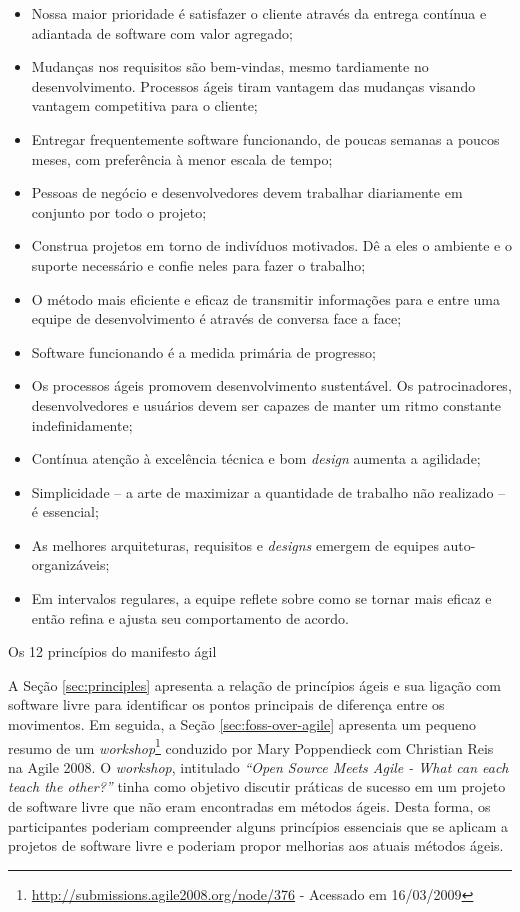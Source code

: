 \begin{caixa}[htb]
\begin{minipage}{\linewidth}
    \begin{itemize}
    \item Nossa maior prioridade é satisfazer o cliente através da
      entrega contínua e adiantada de software com valor agregado;
    \item Mudanças nos requisitos são bem-vindas, mesmo tardiamente no
      desenvolvimento.  Processos ágeis tiram vantagem das mudanças
      visando vantagem competitiva para o cliente;
    \item Entregar frequentemente software funcionando, de poucas
      semanas a poucos meses, com preferência à menor escala de tempo;
    \item Pessoas de negócio e desenvolvedores devem trabalhar
      diariamente em conjunto por todo o projeto;
    \item Construa projetos em torno de indivíduos motivados.  Dê a
      eles o ambiente e o suporte necessário e confie neles para fazer
      o trabalho;
    \item O método mais eficiente e eficaz de transmitir informações
      para e entre uma equipe de desenvolvimento é através de conversa
      face a face;
    \item Software funcionando é a medida primária de progresso;
    \item Os processos ágeis promovem desenvolvimento sustentável. Os
      patrocinadores, desenvolvedores e usuários devem ser capazes de
      manter um ritmo constante indefinidamente;
    \item Contínua atenção à excelência técnica e bom \textit{design}
      aumenta a agilidade;
    \item Simplicidade -- a arte de maximizar a quantidade de trabalho
      não realizado -- é essencial;
    \item As melhores arquiteturas, requisitos e \textit{designs}
      emergem de equipes auto-organizáveis;
    \item Em intervalos regulares, a equipe reflete sobre como se
      tornar mais eficaz e então refina e ajusta seu comportamento de
      acordo.
    \end{itemize}
  \end{minipage}
  \caption{Os 12 princípios do manifesto ágil}
  \label{box:principles}
\end{caixa}

A Seção \ref{sec:principles} apresenta a relação de princípios ágeis e
sua ligação com software livre para identificar os pontos principais
de diferença entre os movimentos. Em seguida, a Seção
\ref{sec:foss-over-agile} apresenta um pequeno resumo de um
\textit{workshop}\footnote{\url{http://submissions.agile2008.org/node/376}
  - Acessado em 16/03/2009} conduzido por Mary Poppendieck com
Christian Reis na Agile 2008. O \textit{workshop}, intitulado
\textit{``Open Source Meets Agile - What can each teach the other?''}
tinha como objetivo discutir práticas de sucesso em um projeto de
software livre que não eram encontradas em métodos ágeis. Desta forma,
os participantes poderiam compreender alguns princípios essenciais que
se aplicam a projetos de software livre e poderiam propor melhorias
aos atuais métodos ágeis.

